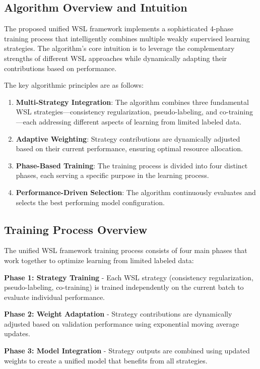 \documentclass{ieeeaccess}
\begin{document}
\subsection{Algorithm Overview and Intuition}
The proposed unified WSL framework implements a sophisticated 4-phase training process that intelligently combines multiple weakly supervised learning strategies. The algorithm's core intuition is to leverage the complementary strengths of different WSL approaches while dynamically adapting their contributions based on performance.

The key algorithmic principles are as follows:

\begin{enumerate}
\item \textbf{Multi-Strategy Integration}: The algorithm combines three fundamental WSL strategies—consistency regularization, pseudo-labeling, and co-training—each addressing different aspects of learning from limited labeled data.
\item \textbf{Adaptive Weighting}: Strategy contributions are dynamically adjusted based on their current performance, ensuring optimal resource allocation.
\item \textbf{Phase-Based Training}: The training process is divided into four distinct phases, each serving a specific purpose in the learning process.
\item \textbf{Performance-Driven Selection}: The algorithm continuously evaluates and selects the best performing model configuration.
\end{enumerate}

\subsection{Training Process Overview}

The unified WSL framework training process consists of four main phases that work together to optimize learning from limited labeled data:

\textbf{Phase 1: Strategy Training} - Each WSL strategy (consistency regularization, pseudo-labeling, co-training) is trained independently on the current batch to evaluate individual performance.

\textbf{Phase 2: Weight Adaptation} - Strategy contributions are dynamically adjusted based on validation performance using exponential moving average updates.

\textbf{Phase 3: Model Integration} - Strategy outputs are combined using updated weights to create a unified model that benefits from all strategies.
\end{document}
